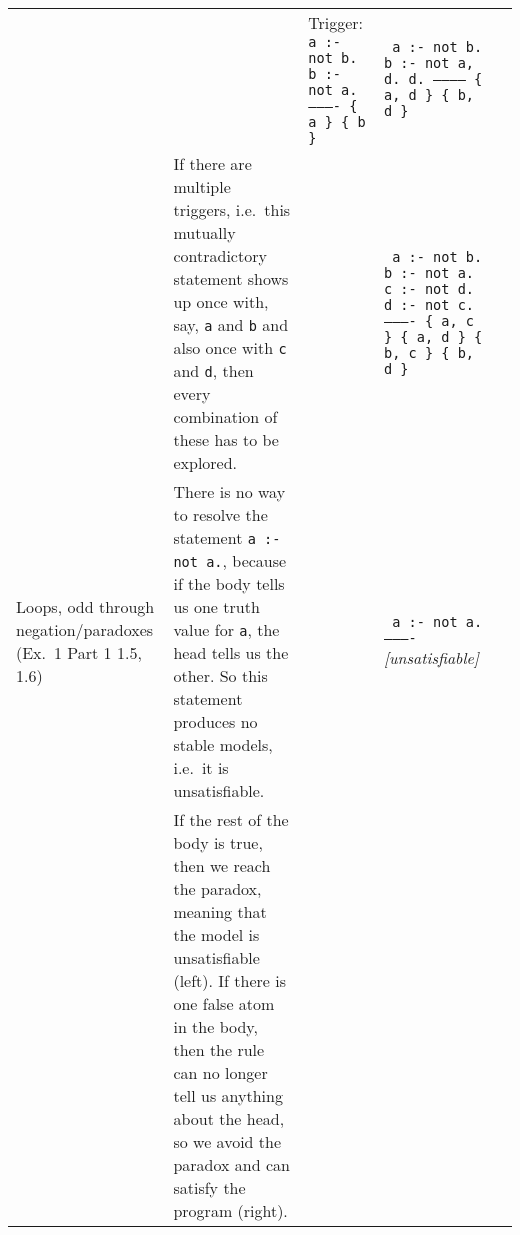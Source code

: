 \documentclass[9pt,a4paper,landscape]{article}
\begin{document}
{\begin{longtable}{Lp{14.5cm}lXX}
&& Trigger: \newline
\texttt{%
	a :- not b. \newline
	b :- not a. \newline
	---------- \newline
	\{ a \} \newline
	\{ b \}}
& \texttt{%
	a :- not b. \newline
	b :- not a, d. \newline
	d. \newline
	----------- \newline
	\{ a, d \} \newline
	\{ b, d \}} \newline \\ %


& If there are multiple triggers, i.e.\ this mutually contradictory statement shows up once with, say, \texttt{a} and \texttt{b} and also once with \texttt{c} and \texttt{d}, then every combination of these has to be explored.
&& \texttt{%
	a :- not b. \newline
	b :- not a. \newline
	c :- not d. \newline
	d :- not c. \newline
	---------- \newline
	\{ a, c \} \newline
	\{ a, d \} \newline
	\{ b, c \} \newline
	\{ b, d \}}
&\\ \midrule

Loops, odd \newline through negation\slash \newline paradoxes \newline (Ex.\ 1 Part 1  1.5, 1.6)
& There is no way to resolve the statement \texttt{a :- not a.}, because if the body tells us one truth value for \texttt{a}, the head tells us the other.
So this statement produces no stable models, i.e.\ it is unsatisfiable.		
&& \texttt{%
	a :- not a. \newline
	---------- \newline}
\textit{[unsatisfiable]}
& \\ %

& If the rest of the body is true, then we reach the paradox, meaning that the model is unsatisfiable (left).
If there is one false atom in the body, then the rule can no longer tell us anything about the head, so we avoid the paradox and can satisfy the program (right).\newline


\end{longtable}}
\end{document}
